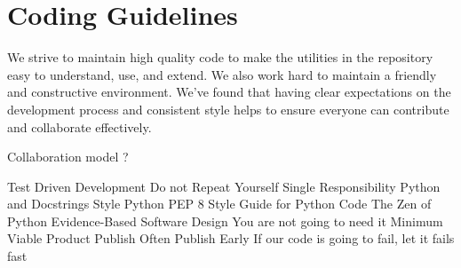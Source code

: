 \section{Coding Guidelines}

We strive to maintain high quality code to make the utilities in the repository easy to understand, use, and extend. We also work hard to maintain a friendly and constructive environment. We've found that having clear expectations on the development process and consistent style helps to ensure everyone can contribute and collaborate effectively.

Collaboration model ?

Test Driven Development
Do not Repeat Yourself
Single Responsibility
Python and Docstrings Style
Python PEP 8 Style Guide for Python Code
The Zen of Python
Evidence-Based Software Design
You are not going to need it
Minimum Viable Product
Publish Often Publish Early
If our code is going to fail, let it fails fast

